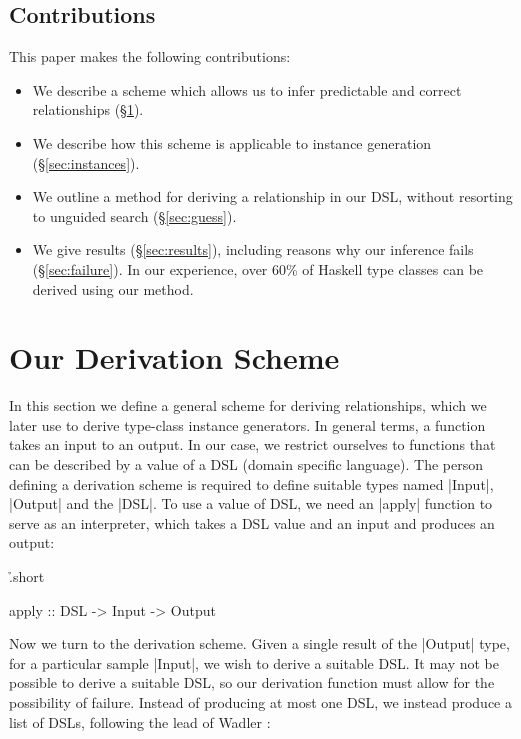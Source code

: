 \documentclass{llncs}
\newcommand\citet\cite
\begin{document}
\subsection{Contributions}

This paper makes the following contributions:

\begin{itemize}
\item We describe a scheme which allows us to infer predictable and correct relationships (\S\ref{sec:scheme}).
\item We describe how this scheme is applicable to instance generation (\S\ref{sec:instances}).
\item We outline a method for deriving a relationship in our DSL, without resorting to unguided search (\S\ref{sec:guess}).
\item We give results (\S\ref{sec:results}), including reasons why our inference fails (\S\ref{sec:failure}). In our experience, over 60\% of Haskell type classes can be derived using our method.
\end{itemize}

\section{Our Derivation Scheme}
\label{sec:scheme}

In this section we define a general scheme for deriving relationships, which we later use to derive type-class instance generators. In general terms, a function takes an input to an output. In our case, we restrict ourselves to functions that can be described by a value of a DSL (domain specific language). The person defining a derivation scheme is required to define suitable types named |Input|, |Output| and the |DSL|. To use a value of DSL, we need an |apply| function to serve as an interpreter, which takes a DSL value and an input and produces an output:

\h{.short}\begin{code}
apply :: DSL -> Input -> Output
\end{code}

Now we turn to the derivation scheme. Given a single result of the |Output| type, for a particular sample |Input|, we wish to derive a suitable DSL. It may not be possible to derive a suitable DSL, so our derivation function must allow for the possibility of failure. Instead of producing at most one DSL, we instead produce a list of DSLs, following the lead of Wadler \citet{wadler:list_of_successes}:
\end{document}
